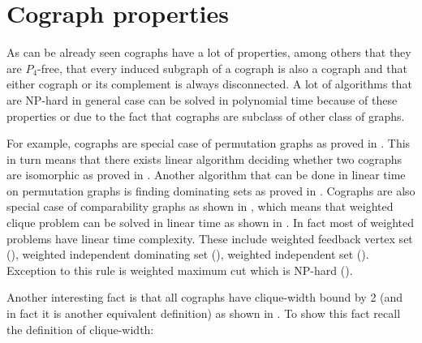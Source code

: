 
\section{Cograph properties}

As can be already seen cographs have a lot of properties, among others that they are $P_4$-free, that every induced subgraph of a cograph is also a cograph and that either cograph or its complement is always disconnected. A lot of algorithms that are NP-hard in general case can be solved in polynomial time because of these properties or due to the fact that cographs are subclass of other class of graphs.

For example, cographs are special case of permutation graphs as proved in \cite{bose}. This in turn means that there exists linear algorithm deciding whether two cographs are isomorphic as proved in \cite{colbourn}. Another algorithm that can be done in linear time on permutation graphs is finding dominating sets as proved in \cite{chao}. Cographs are also special case of comparability graphs as shown in \cite{jung}, which means that weighted clique problem can be solved in linear time as shown in \cite{golumbic}. In fact most of weighted problems have linear time complexity. These include weighted feedback vertex set (\cite{coudert}), weighted independent dominating set (\cite{coudert}),  weighted independent set (\cite{bodlaender2}). Exception to this rule is weighted maximum cut which is NP-hard (\cite{kaminski}).

Another interesting fact is that all cographs have clique-width bound by 2 (and in fact it is another equivalent definition) as shown in \cite{courcelle}. To show this fact recall the definition of clique-width:

